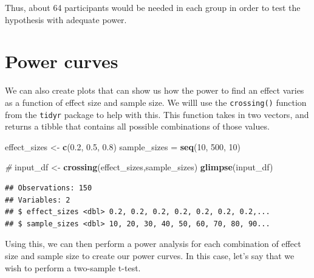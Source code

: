 \documentclass[12pt,]{book}
\newenvironment{Shaded}{\begin{snugshade}}{\end{snugshade}}
\newcommand{\CommentTok}[1]{\textcolor[rgb]{0.56,0.35,0.01}{\textit{#1}}}
\newcommand{\DecValTok}[1]{\textcolor[rgb]{0.00,0.00,0.81}{#1}}
\newcommand{\FloatTok}[1]{\textcolor[rgb]{0.00,0.00,0.81}{#1}}
\newcommand{\KeywordTok}[1]{\textcolor[rgb]{0.13,0.29,0.53}{\textbf{#1}}}
\newcommand{\NormalTok}[1]{#1}
\newcommand{\StringTok}[1]{\textcolor[rgb]{0.31,0.60,0.02}{#1}}
\begin{document}
Thus, about 64 participants would be needed in each group in order to test the hypothesis with adequate power.

\hypertarget{power-curves}{%
\section{Power curves}\label{power-curves}}

We can also create plots that can show us how the power to find an effect varies as a function of effect size and sample size. We willl use the \texttt{crossing()} function from the \texttt{tidyr} package to help with this. This function takes in two vectors, and returns a tibble that contains all possible combinations of those values.

\begin{Shaded}
\begin{Highlighting}[]
\NormalTok{effect_sizes <-}\StringTok{ }\KeywordTok{c}\NormalTok{(}\FloatTok{0.2}\NormalTok{, }\FloatTok{0.5}\NormalTok{, }\FloatTok{0.8}\NormalTok{) }
\NormalTok{sample_sizes =}\StringTok{ }\KeywordTok{seq}\NormalTok{(}\DecValTok{10}\NormalTok{, }\DecValTok{500}\NormalTok{, }\DecValTok{10}\NormalTok{)}

\CommentTok{#}
\NormalTok{input_df <-}\StringTok{ }\KeywordTok{crossing}\NormalTok{(effect_sizes,sample_sizes)}
\KeywordTok{glimpse}\NormalTok{(input_df)}
\end{Highlighting}
\end{Shaded}

\begin{verbatim}
## Observations: 150
## Variables: 2
## $ effect_sizes <dbl> 0.2, 0.2, 0.2, 0.2, 0.2, 0.2, 0.2,...
## $ sample_sizes <dbl> 10, 20, 30, 40, 50, 60, 70, 80, 90...
\end{verbatim}

Using this, we can then perform a power analysis for each combination of effect size and sample size to create our power curves. In this case, let's say that we wish to perform a two-sample t-test.
\end{document}
